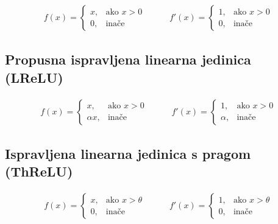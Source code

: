 \documentclass[times, utf8, diplomski]{fer}
\begin{document}
\begin{equation}
\begin{split}
f(x) = 
\begin{cases}
x,		& \text{ako } x > 0 \\
0,		& \text{inače}
\end{cases}
\end{split}
\qquad
\begin{split}
f'(x) = 
\begin{cases}
1,		& \text{ako } x > 0 \\
0,		& \text{inače}
\end{cases}
\end{split}
\end{equation}

\subsection*{Propusna ispravljena linearna jedinica (LReLU)}

\begin{equation}
\begin{split}
f(x) = 
\begin{cases}
x,			& \text{ako } x > 0 \\
\alpha x,	& \text{inače}
\end{cases}
\end{split}
\qquad
\begin{split}
f'(x) = 
\begin{cases}
1,		& \text{ako } x > 0 \\
\alpha,	& \text{inače}
\end{cases}
\end{split}
\end{equation}

\subsection*{Ispravljena linearna jedinica s pragom (ThReLU)}

\begin{equation}
\begin{split}
f(x) = 
\begin{cases}
x,		& \text{ako } x > \theta \\
0,		& \text{inače}
\end{cases}
\end{split}
\qquad
\begin{split}
f'(x) = 
\begin{cases}
1,		& \text{ako } x > \theta \\
0,		& \text{inače}
\end{cases}
\end{split}
\end{equation}
\end{document}
